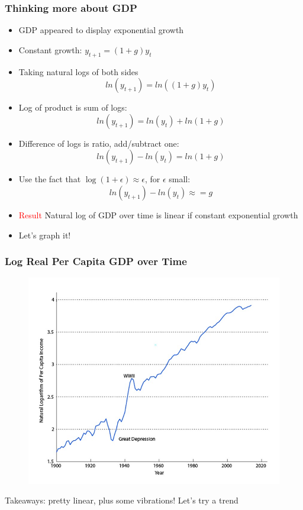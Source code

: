 \documentclass{beamer}
\begin{document}
\begin{frame}
\frametitle[alignment=center]{Thinking more about GDP}
\begin{itemize}
\item GDP appeared to display exponential growth
\bigskip
\item Constant growth: $y_{t+1}=(1+g)y_t$
\bigskip
\item Taking natural logs of both sides
$$ln(y_{t+1})=ln((1+g)y_t)$$
\item Log of product is sum of logs:
$$ln(y_{t+1})=ln(y_t)+ln(1+g)$$
\item Difference of logs is ratio, add/subtract one:
$$ln(y_{t+1})-ln(y_t)=ln(1+g)$$
\item Use the fact that $\log(1+\epsilon)\approx\epsilon$, for $\epsilon$ small:
$$ln(y_{t+1})-ln(y_t)\approx=g$$
\item \textcolor{red}{Result} \textcolor{black} Natural log of GDP over time is linear if constant exponential growth
\bigskip
\item Let's graph it!
\end{itemize}
\end{frame}


\begin{frame}
\frametitle[alignment=center]{Log Real Per Capita GDP over Time}
\begin{figure}
\includegraphics[scale=0.6]{Figures/W_Fig_1pt2.png}
\end{figure}
Takeaways:  pretty linear, plus some vibrations!  Let's try a trend
\end{frame}
\end{document}
